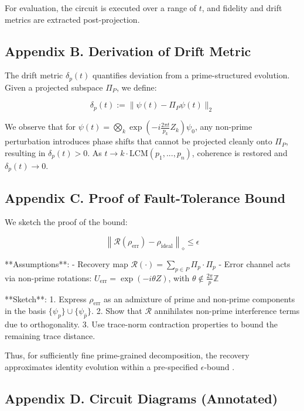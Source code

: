 \documentclass[12]{amsart}
\theoremstyle{plain}
\begin{document}
For evaluation, the circuit is executed over a range of \( t \), and fidelity and drift metrics are extracted post-projection.

\subsection*{Appendix B. Derivation of Drift Metric}

The drift metric \( \delta_p(t) \) quantifies deviation from a prime-structured evolution. Given a projected subspace \( \Pi_P \), we define:

\[
\delta_p(t) := \| \psi(t) - \Pi_P \psi(t) \|_2
\]

We observe that for \( \psi(t) = \bigotimes_k \exp\left( -i \frac{2\pi t}{p_k} Z_k \right) \psi_0 \), any non-prime perturbation introduces phase shifts that cannot be projected cleanly onto \( \Pi_P \), resulting in \( \delta_p(t) > 0 \). As \( t \to k \cdot \text{LCM}(p_1, ..., p_n) \), coherence is restored and \( \delta_p(t) \to 0 \).

\subsection*{Appendix C. Proof of Fault-Tolerance Bound}

We sketch the proof of the bound:

\[
\left\| \mathcal{R}(\rho_{\text{err}}) - \rho_{\text{ideal}} \right\|_\diamond \leq \epsilon
\]

**Assumptions**:
- Recovery map \( \mathcal{R}(\cdot) = \sum_{p \in P} \Pi_p \cdot \Pi_p \)
- Error channel acts via non-prime rotations: \( U_{\text{err}} = \exp(-i \theta Z) \), with \( \theta \notin \frac{2\pi}{p} \mathbb{Z} \)

**Sketch**:
1. Express \( \rho_{\text{err}} \) as an admixture of prime and non-prime components in the basis \( \{ \psi_p \} \cup \{ \psi_{\bar{p}} \} \).
2. Show that \( \mathcal{R} \) annihilates non-prime interference terms due to orthogonality.
3. Use trace-norm contraction properties to bound the remaining trace distance.

Thus, for sufficiently fine prime-grained decomposition, the recovery approximates identity evolution within a pre-specified \( \epsilon \)-bound \cite{nielsen2000quantum}.

\subsection*{Appendix D. Circuit Diagrams (Annotated)}
\end{document}

